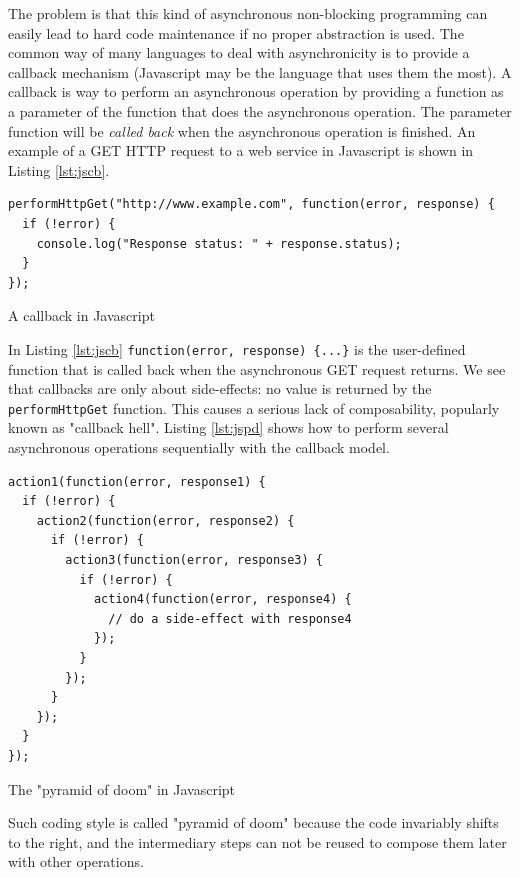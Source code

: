 The problem is that this kind of asynchronous non-blocking programming can easily lead to hard code maintenance if no proper abstraction is used. The common way
of many languages to deal with asynchronicity is to provide a callback mechanism (Javascript may be the language that uses them the most). A callback is
way to perform an asynchronous operation by providing a function as a parameter of the function that does the asynchronous operation. The parameter function
will be \textit{called back} when the asynchronous operation is finished. An example of a GET HTTP request to a web service in Javascript is shown in Listing 
\ref{lst:jscb}.

\begin{listing}[h]
\begin{verbatim}
performHttpGet("http://www.example.com", function(error, response) {
  if (!error) {
    console.log("Response status: " + response.status);
  }
});
\end{verbatim}
\caption{A callback in Javascript}
\label{lst:jscb}
\end{listing}

In Listing \ref{lst:jscb} \verb|function(error, response) {...}| is the user-defined function that is called back when the asynchronous GET request
returns. We see that callbacks are only about side-effects: no value is returned by the \verb|performHttpGet| function.
This causes a serious lack of composability, popularly known as "callback hell". Listing \ref{lst:jspd} shows how to perform several asynchronous operations
sequentially with the callback model.

\begin{listing}[h]
\begin{verbatim}
action1(function(error, response1) {
  if (!error) {
    action2(function(error, response2) {
      if (!error) {
        action3(function(error, response3) {
          if (!error) {
            action4(function(error, response4) {
              // do a side-effect with response4       
            });
          }
        });
      }
    });
  }
});
\end{verbatim}
\caption{The "pyramid of doom" in Javascript}
\label{lst:jspd}
\end{listing}

Such coding style is called "pyramid of doom" because the code invariably shifts to the right, and the intermediary steps can not be reused to compose
them later with other operations. 

